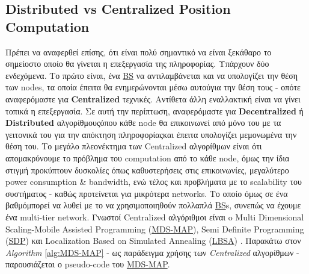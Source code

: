 \subsection{Distributed vs Centralized Position Computation}
Πρέπει να αναφερθεί επίσης, ότι είναι πολύ σημαντικό να είναι ξεκάθαρο το σημείο\udot στο οποίο
θα γίνεται η επεξεργασία της πληροφορίας. Υπάρχουν δύο ενδεχόμενα. Το πρώτο
είναι, ένα \hyperref[abbr:BS]{BS} να αντιλαμβάνεται και να υπολογίζει την θέση των nodes, τα οποία
έπειτα θα ενημερώνονται μέσω αυτού\udot για την θέση τους - οπότε αναφερόμαστε για \textbf{Centralized} τεχνικές. Αντίθετα άλλη εναλλακτική 
είναι να γίνει τοπικά η επεξεργασία. Σε αυτή την περίπτωση, αναφερόμαστε για \textbf{Decentralized} ή \textbf{Distri\-bu\-ted} αλγορίθμους\udot όπου κάθε node θα 
επικοινωνεί από μόνο του με τα γειτονικά του για την απόκτηση πληροφορίας\udot και έπειτα υπολογίζει μεμονωμένα την θέση του. 
Το μεγάλο πλεονέκτημα των Centralized αλγορίθμων είναι ότι απομακρύνουμε το πρόβλημα του computation από το κάθε node, όμως την ίδια στιγμή
προκύπτουν δυσκολίες όπως καθυστερήσεις στις επικοινωνίες, μεγαλύτερο power consumption \& bandwidth, ενώ τέλος
και προβλήματα με το scalability του συστήματος - καθώς προτείνεται για μικρότερα networks. Το οποίο όμως σε ένα βαθμό\udot μπορεί να λυθεί
με το να χρησιμοποιηθούν πολλαπλά \hyperref[abbr:BS]{BS}s, συνεπώς να έχουμε ένα multi-tier network.
Γνωστοί Centralized αλγόριθμοι είναι o Multi Dimensional Scaling-Mobile Assisted Programming (\hyperref[abbr:MDS-MAP]{MDS-MAP}), 
Semi Definite Programming (\hyperref[abbr:SDP]{SDP}) και Localization Based on Simulated Annealing (\hyperref[abbr:LBSA]{LBSA}) \cite{range-distributed}.
Παρακάτω στον \emph{Algorithm} \ref{alg:MDS-MAP} - ως παράδειγμα
χρήσης των \emph{Centralized} αλγορίθμων - παρουσιάζεται ο pseudo-code του \hyperref[abbr:MDS-MAP]{MDS-MAP}.

\begin{table}[H]
    \caption[Comparison of Centralized vs Distributed]{Comparison of Centralized vs Distributed \cite{localization-algorithms-comparizon-tables}}
	\label{tab:Comparison-of-Centralized-vs-Distributed}
	\centering
\end{table}

